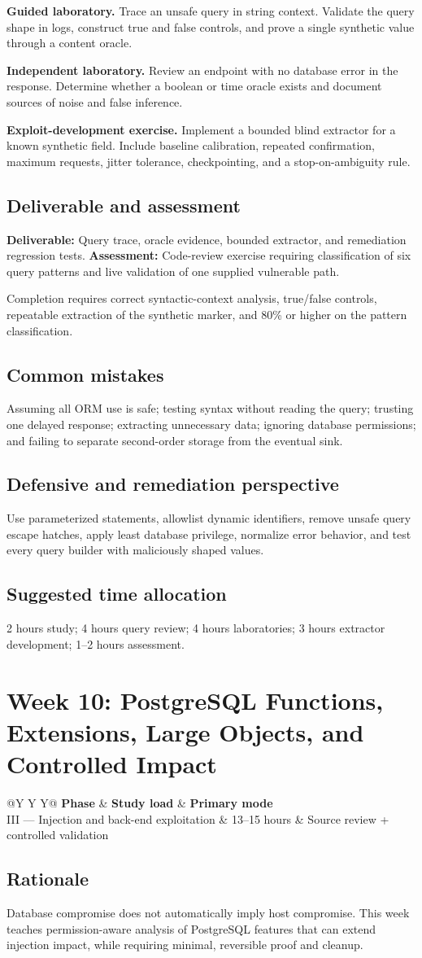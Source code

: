 \documentclass[11pt]{article}
\makeatletter
\newcommand{\weekheader}[4]{%
  \clearpage
  \section{Week #1: #2}
  \begin{tcolorbox}[colback=Navy,colframe=Navy,coltext=white]
    \begin{tabularx}{\linewidth}{@{}Y Y Y@{}}
      \textbf{Phase} & \textbf{Study load} & \textbf{Primary mode}\\
      #3 & #4 hours & Source review + controlled validation
    \end{tabularx}
  \end{tcolorbox}
}
\newcommand{\weekfield}[2]{%
  \Needspace{5\baselineskip}
  \subsection*{#1}
  #2
}
\newcommand{\deliverable}[1]{\textbf{Deliverable:} #1}
\newcommand{\assessment}[1]{\textbf{Assessment:} #1}
\makeatother
\begin{document}
\begin{labbox}
\textbf{Guided laboratory.} Trace an unsafe query in string context. Validate the
query shape in logs, construct true and false controls, and prove a single
synthetic value through a content oracle.

\textbf{Independent laboratory.} Review an endpoint with no database error in the
response. Determine whether a boolean or time oracle exists and document sources
of noise and false inference.

\textbf{Exploit-development exercise.} Implement a bounded blind extractor for a
known synthetic field. Include baseline calibration, repeated confirmation,
maximum requests, jitter tolerance, checkpointing, and a stop-on-ambiguity rule.
\end{labbox}

\weekfield{Deliverable and assessment}{\deliverable{Query trace, oracle evidence,
bounded extractor, and remediation regression tests.}
\assessment{Code-review exercise requiring classification of six query patterns
and live validation of one supplied vulnerable path.}}

\begin{checkpoints}
Completion requires correct syntactic-context analysis, true/false controls,
repeatable extraction of the synthetic marker, and 80\% or higher on the pattern
classification.
\end{checkpoints}

\weekfield{Common mistakes}{Assuming all ORM use is safe; testing syntax without
reading the query; trusting one delayed response; extracting unnecessary data;
ignoring database permissions; and failing to separate second-order storage from
the eventual sink.}

\weekfield{Defensive and remediation perspective}{Use parameterized statements,
allowlist dynamic identifiers, remove unsafe query escape hatches, apply least
database privilege, normalize error behavior, and test every query builder with
maliciously shaped values.}

\weekfield{Suggested time allocation}{2 hours study; 4 hours query review; 4
hours laboratories; 3 hours extractor development; 1--2 hours assessment.}

\weekheader{10}{PostgreSQL Functions, Extensions, Large Objects, and Controlled Impact}{III --- Injection and back-end exploitation}{13--15}

\weekfield{Rationale}{Database compromise does not automatically imply host
compromise. This week teaches permission-aware analysis of PostgreSQL features
that can extend injection impact, while requiring minimal, reversible proof and
cleanup.}
\end{document}
